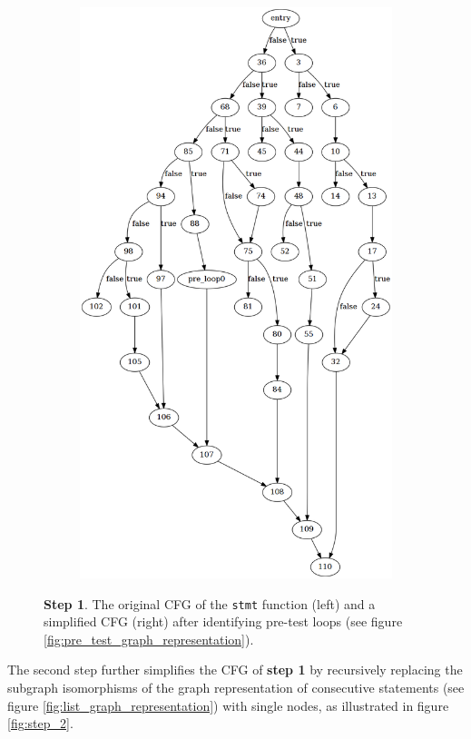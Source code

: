 \begin{figure}[htbp]
\begin{subfigure}[t]{0.45\textwidth}
		\includegraphics[width=\textwidth]{appendices/stmt_example/stmt_1.png}
	\end{subfigure}
	\caption{\textbf{Step 1}. The original CFG of the \texttt{stmt} function (left) and a simplified CFG (right) after identifying pre-test loops (see figure \ref{fig:pre_test_graph_representation}).}
	\label{fig:step_1}
\end{figure}

The second step further simplifies the CFG of \textbf{step 1} by recursively replacing the subgraph isomorphisms of the graph representation of consecutive statements (see figure \ref{fig:list_graph_representation}) with single nodes, as illustrated in figure \ref{fig:step_2}.

